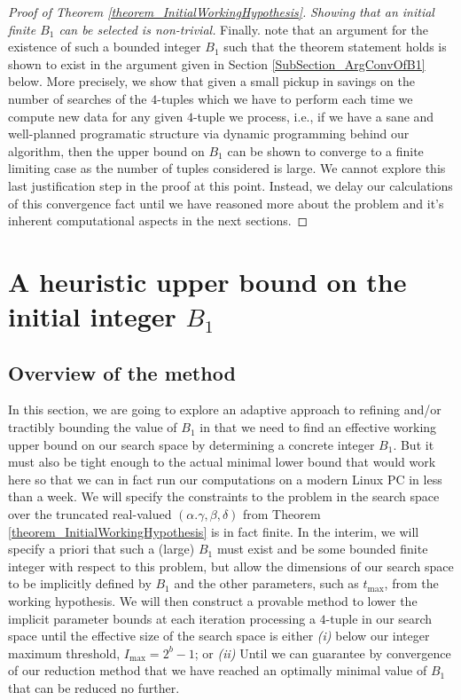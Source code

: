\documentclass[12pt]{article}
\begin{document}
\begin{proof}[Proof of Theorem \ref{theorem_InitialWorkingHypothesis}]
\bigskip\noindent
\textit{Showing that an initial finite $B_1$ can be selected is non-trivial.} 
Finally. note that an argument for the existence of such a bounded integer $B_1$ such that the theorem 
statement holds is shown to exist in the argument given in 
Section \ref{SubSection_ArgConvOfB1} below. More precisely, we show that given a small pickup in savings on the 
number of searches of the $4$-tuples which we have to perform each time we compute new data for any given 
$4$-tuple we process, i.e., if we have a sane and well-planned programatic structure via dynamic 
programming behind our algorithm, then the upper bound on $B_1$ can be shown to converge to a finite 
limiting case as the number of tuples considered is large. We cannot explore this last justification step 
in the proof at this point. Instead, we delay our calculations of this convergence fact until we have 
reasoned more about the problem and it's inherent computational aspects in the next sections. 
\end{proof} 

\section{A heuristic upper bound on the initial integer $B_1$} 

\subsection{Overview of the method} 

In this section, we are going to explore an adaptive 
approach to refining and/or tractibly bounding the value of $B_1$ in that 
we need to find an effective working upper bound on our search space by determining a concrete integer 
$B_1$. But it must also be tight enough to the actual minimal lower bound that would work here so that 
we can in fact run our computations on a modern Linux PC in less than a week. 
We will specify the constraints to the problem in the search space over the truncated real-valued 
$(\alpha.\gamma,\beta,\delta)$ from Theorem \ref{theorem_InitialWorkingHypothesis} 
is in fact finite. In the interim, we will specify a priori that such a (large) $B_1$ must exist and 
be some bounded finite integer with respect to this problem, but allow the dimensions of our 
search space to be implicitly defined by $B_1$ and the other parameters, such as $t_{\max}$, from the 
working hypothesis. We will then construct a provable method to lower the implicit parameter bounds at 
each iteration processing a $4$-tuple in our search space until the effective size of the search space 
is either \textit{(i)} below our integer maximum threshold, $I_{\max} = 2^b-1$; or 
\textit{(ii)} Until we can guarantee by 
convergence of our reduction method that we have reached an optimally minimal value of $B_1$ that can be 
reduced no further. 
\end{document}

